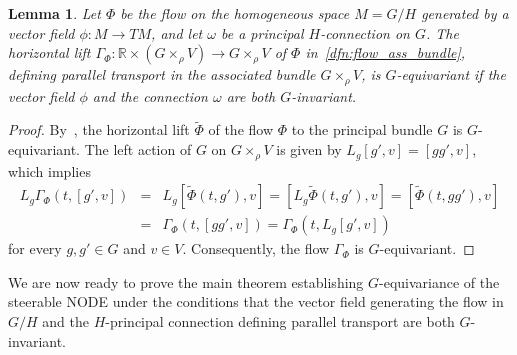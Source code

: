\documentclass[12pt,a4paper]{article}
\numberwithin{equation}{section}
\newcommand{\R}{\mathbb{R}}
\theoremstyle{plain}
\newtheorem{lemma}[theorem]{Lemma}
\theoremstyle{definition}
\theoremstyle{remark}
\begin{document}
\begin{lemma}\label{lem:equiv_lift_ass}
    Let $\Phi$ be the flow on the homogeneous space $M=G/H$ generated by a vector field $\phi: M \to TM$, and let $\omega$ be a principal $H$-connection on $G$. The horizontal lift $\Gamma_{\Phi}: \R \times (G \times_{\rho} V) \to G \times_{\rho} V$ of $\Phi$ in~\cref{dfn:flow_ass_bundle}, defining parallel transport in the associated bundle $G \times_{\rho} V$, is $G$-equivariant if the vector field $\phi$ and the connection $\omega$ are both $G$-invariant.
\end{lemma}
\begin{proof}
    By~, the horizontal lift $\tilde{\Phi}$ of the flow $\Phi$ to the principal bundle $G$ is $G$-equivariant. The left action of $G$ on $G\times_{\rho}V$ is given by $L_g[g',v] = [gg',v]$, which implies
    \begin{eqnarray*}
        L_g \Gamma_{\Phi}(t,[g',v]) &=& L_g\left[\tilde{\Phi}(t,g'),v\right] = \left[L_g\tilde{\Phi}(t,g'),v\right] = \left[\tilde{\Phi}(t,gg'),v\right]\\
        &=& \Gamma_{\Phi}(t,[gg',v]) = \Gamma_{\Phi}(t,L_g[g',v])
    \end{eqnarray*}
    for every $g,g'\in G$ and $v \in V$. Consequently, the flow $\Gamma_{\Phi}$ is $G$-equivariant.
\end{proof}

We are now ready to prove the main theorem establishing $G$-equivariance of the steerable NODE under the conditions that the vector field generating the flow in $G/H$ and the $H$-principal connection defining parallel transport are both $G$-invariant.
\end{document}
